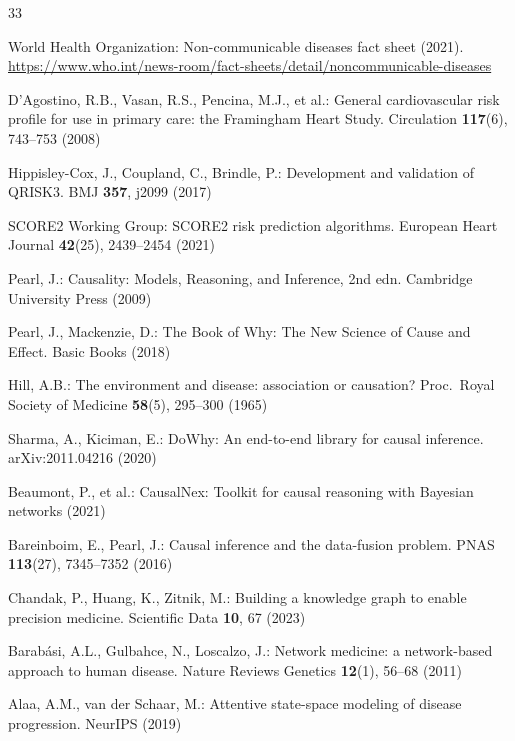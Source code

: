 \documentclass[runningheads]{llncs}
\begin{document}
\begin{thebibliography}{33}

World Health Organization:
Non-communicable diseases fact sheet (2021).
\url{https://www.who.int/news-room/fact-sheets/detail/noncommunicable-diseases}

D'Agostino, R.B., Vasan, R.S., Pencina, M.J., et al.:
General cardiovascular risk profile for use in primary care:
the Framingham Heart Study.
Circulation \textbf{117}(6), 743--753 (2008)

Hippisley-Cox, J., Coupland, C., Brindle, P.:
Development and validation of QRISK3.
BMJ \textbf{357}, j2099 (2017)

SCORE2 Working Group:
SCORE2 risk prediction algorithms.
European Heart Journal \textbf{42}(25), 2439--2454 (2021)

Pearl, J.:
Causality: Models, Reasoning, and Inference, 2nd edn.
Cambridge University Press (2009)

Pearl, J., Mackenzie, D.:
The Book of Why: The New Science of Cause and Effect.
Basic Books (2018)

Hill, A.B.:
The environment and disease: association or causation?
Proc.\ Royal Society of Medicine \textbf{58}(5), 295--300 (1965)

Sharma, A., Kiciman, E.:
DoWhy: An end-to-end library for causal inference.
arXiv:2011.04216 (2020)

Beaumont, P., et al.:
CausalNex: Toolkit for causal reasoning with Bayesian networks (2021)

Bareinboim, E., Pearl, J.:
Causal inference and the data-fusion problem.
PNAS \textbf{113}(27), 7345--7352 (2016)

Chandak, P., Huang, K., Zitnik, M.:
Building a knowledge graph to enable precision medicine.
Scientific Data \textbf{10}, 67 (2023)

Barab\'{a}si, A.L., Gulbahce, N., Loscalzo, J.:
Network medicine: a network-based approach to human disease.
Nature Reviews Genetics \textbf{12}(1), 56--68 (2011)

Alaa, A.M., van der Schaar, M.:
Attentive state-space modeling of disease progression.
NeurIPS (2019)


\end{thebibliography}
\end{document}
